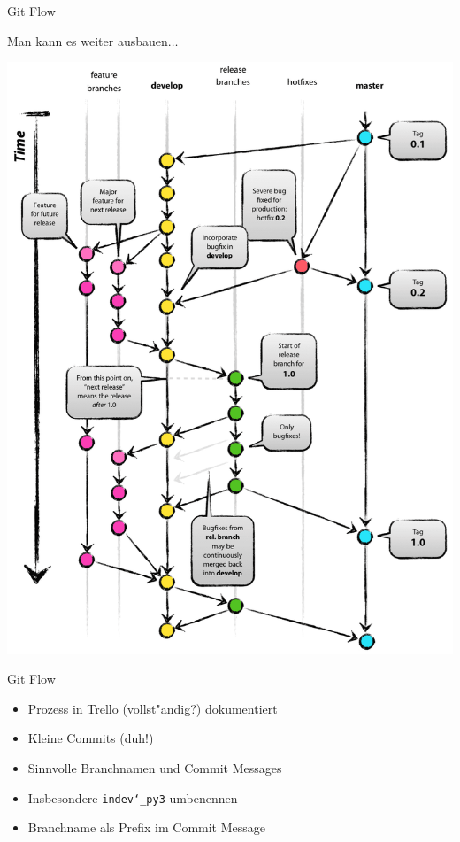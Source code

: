 \documentclass{beamer}
\begin{document}
\begin{frame}{Git Flow}
	\begin{center}
		Man kann es weiter ausbauen$\ldots$
		
		\includegraphics[height=.8\textheight]{git-model.png}
	\end{center}
\end{frame}

\begin{frame}{Git Flow}
	\begin{itemize}
		\item Prozess in Trello (vollst"andig?) dokumentiert
		\item Kleine Commits (duh!)
		\item Sinnvolle Branchnamen und Commit Messages
		\item[] Insbesondere \texttt{indev\char`_py3} umbenennen
		\item Branchname als Prefix im Commit Message
	\end{itemize}
\end{frame}
\end{document}
